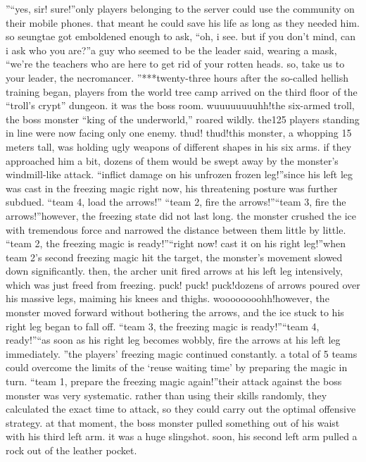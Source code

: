 ”“yes, sir! sure!”only players belonging to the server could use the community on their mobile phones.
that meant he could save his life as long as they needed him.
so seungtae got emboldened enough to ask, “oh, i see.
 but if you don’t mind, can i ask who you are?”a guy who seemed to be the leader said, wearing a mask, “we’re the teachers who are here to get rid of your rotten heads.
 so, take us to your leader, the necromancer.
”***twenty-three hours after the so-called hellish training began, players from the world tree camp arrived on the third floor of the “troll’s crypt” dungeon.
it was the boss room.
wuuuuuuuuhh!the six-armed troll, the boss monster “king of the underworld,” roared wildly.
the125 players standing in line were now facing only one enemy.
thud! thud!this monster, a whopping 15 meters tall, was holding ugly weapons of different shapes in his six arms.
 if they approached him a bit, dozens of them would be swept away by the monster’s windmill-like attack.
“inflict damage on his unfrozen frozen leg!”since his left leg was cast in the freezing magic right now, his threatening posture was further subdued.
“team 4, load the arrows!”
“team 2, fire the arrows!”“team 3, fire the arrows!”however, the freezing state did not last long.
 the monster crushed the ice with tremendous force and narrowed the distance between them little by little.
“team 2, the freezing magic is ready!”“right now! cast it on his right leg!”when team 2’s second freezing magic hit the target, the monster’s movement slowed down significantly.
 then, the archer unit fired arrows at his left leg intensively, which was just freed from freezing.
puck! puck! puck!dozens of arrows poured over his massive legs, maiming his knees and thighs.
woooooooohh!however, the monster moved forward without bothering the arrows, and the ice stuck to his right leg began to fall off.
“team 3, the freezing magic is ready!”“team 4, ready!”“as soon as his right leg becomes wobbly, fire the arrows at his left leg immediately.
”the players’ freezing magic continued constantly.
 a total of 5 teams could overcome the limits of the ‘reuse waiting time’ by preparing the magic in turn.
“team 1, prepare the freezing magic again!”their attack against the boss monster was very systematic.
 rather than using their skills randomly, they calculated the exact time to attack, so they could carry out the optimal offensive strategy.
at that moment, the boss monster pulled something out of his waist with his third left arm.
 it was a huge slingshot.
 soon, his second left arm pulled a rock out of the leather pocket.
